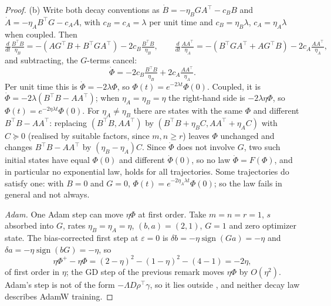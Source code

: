 \begin{proof}
(b) Write both decay conventions as $\dot B=-\eta_BGA^\top-c_BB$ and $\dot A=-\eta_AB^\top G-c_AA$, with $c_B=c_A=\lambda$
per unit time and $c_B=\eta_B\lambda$, $c_A=\eta_A\lambda$ when coupled. Then
\[\tfrac{d}{dt}\tfrac{B^\top B}{\eta_B}=-(AG^\top B+B^\top GA^\top)-2c_B\tfrac{B^\top B}{\eta_B},\qquad
\tfrac{d}{dt}\tfrac{AA^\top}{\eta_A}=-(B^\top GA^\top+AG^\top B)-2c_A\tfrac{AA^\top}{\eta_A},\]
and subtracting, the $G$-terms cancel:
\[\dot\Phi=-2c_B\tfrac{B^\top B}{\eta_B}+2c_A\tfrac{AA^\top}{\eta_A}.\]
Per unit time this is $\dot\Phi=-2\lambda\Phi$, so $\Phi(t)=e^{-2\lambda t}\Phi(0)$. Coupled, it is
$\dot\Phi=-2\lambda(B^\top B-AA^\top)$; when $\eta_A=\eta_B=\eta$ the right-hand side is $-2\lambda\eta\Phi$, so
$\Phi(t)=e^{-2\eta\lambda t}\Phi(0)$. For $\eta_A\ne\eta_B$ there are states with the same $\Phi$ and different
$B^\top B-AA^\top$: replacing $(B^\top B,AA^\top)$ by $(B^\top B+\eta_BC,AA^\top+\eta_AC)$ with $C\succeq0$ (realised by
suitable factors, since $m,n\ge r$) leaves $\Phi$ unchanged and changes $B^\top B-AA^\top$ by $(\eta_B-\eta_A)C$. Since
$\dot\Phi$ does not involve $G$, two such initial states have equal $\Phi(0)$ and different $\dot\Phi(0)$, so no law
$\dot\Phi=F(\Phi)$, and in particular no exponential law, holds for all trajectories. Some trajectories do satisfy one:
with $B=0$ and $G=0$, $\Phi(t)=e^{-2\eta_A\lambda t}\Phi(0)$; so the law fails in general and not always.

\emph{Adam.} One Adam step can move $\eta\Phi$ at first order. Take $m=n=r=1$, $s$ absorbed into $G$, rates
$\eta_B=\eta_A=\eta$, $(b,a)=(2,1)$, $G=1$ and zero optimizer state. The bias-corrected first step at $\varepsilon=0$ is
$\delta b=-\eta\operatorname{sign}(Ga)=-\eta$ and $\delta a=-\eta\operatorname{sign}(bG)=-\eta$, so
\[\eta\Phi^+-\eta\Phi=(2-\eta)^2-(1-\eta)^2-(4-1)=-2\eta,\]
of first order in $\eta$; the GD step of the previous remark moves $\eta\Phi$ by $O(\eta^2)$. Adam's step is not of the
form $-\Lambda D\rho^\top\gamma$, so it lies outside , and neither decay law describes AdamW
training.
\end{proof}

